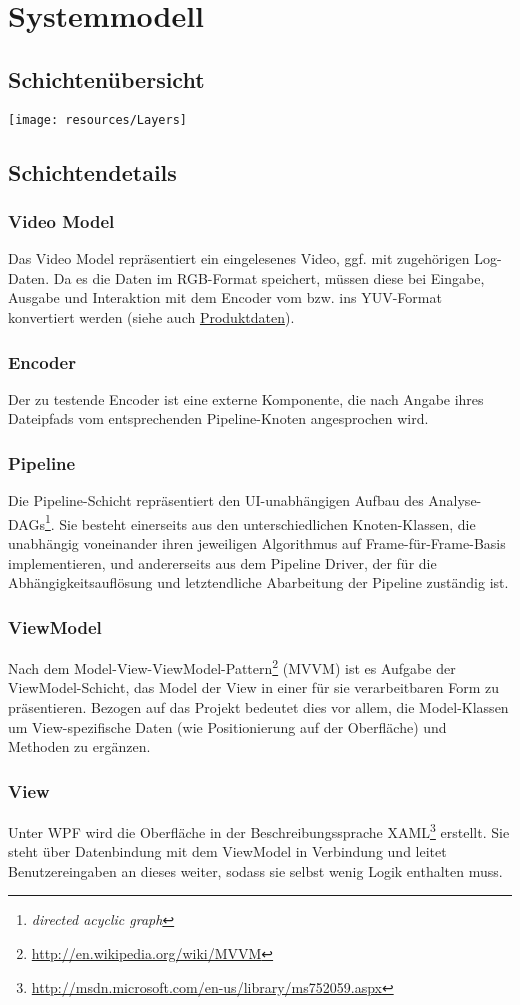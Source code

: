 \section{Systemmodell}

\subsection{Schichtenübersicht}
\texttt{[image: resources/Layers]}

\subsection{Schichtendetails}

\subsubsection*{Video Model}
Das Video Model repräsentiert ein eingelesenes Video, ggf. mit zugehörigen
Log-Daten. Da es die Daten im RGB-Format speichert, müssen diese bei Eingabe,
Ausgabe und Interaktion mit dem Encoder vom bzw. ins YUV-Format konvertiert
werden (siehe auch \hyperref[sec:produktdaten]{Produktdaten}).

\subsubsection*{Encoder}
Der zu testende Encoder ist eine externe Komponente, die nach Angabe ihres
Dateipfads vom entsprechenden Pipeline-Knoten angesprochen wird.

\newpage
\subsubsection*{Pipeline}
Die Pipeline-Schicht repräsentiert den UI-unabhängigen Aufbau des
Analyse-DAGs\footnote{\emph{directed acyclic graph}}. Sie besteht einerseits aus
den unterschiedlichen Knoten-Klassen, die unabhängig voneinander ihren
jeweiligen Algorithmus auf Frame-für-Frame-Basis implementieren, und
andererseits aus dem Pipeline Driver, der für die Abhängigkeitsauflösung und
letztendliche Abarbeitung der Pipeline zuständig ist.

\subsubsection*{ViewModel} Nach dem
Model-View-ViewModel-Pattern\footnote{\url{http://en.wikipedia.org/wiki/MVVM}}
(MVVM) ist es Aufgabe der ViewModel-Schicht, das Model der View in einer für sie
verarbeitbaren Form zu präsentieren. Bezogen auf das Projekt bedeutet dies vor
allem, die Model-Klassen um View-spezifische Daten (wie Positionierung auf der
Oberfläche) und Methoden zu ergänzen.

\subsubsection*{View}
Unter WPF wird die Oberfläche in der Beschreibungssprache
XAML\footnote{\url{http://msdn.microsoft.com/en-us/library/ms752059.aspx}}
erstellt. Sie steht über Datenbindung mit dem ViewModel in Verbindung und leitet
Benutzereingaben an dieses weiter, sodass sie selbst wenig Logik enthalten muss.
